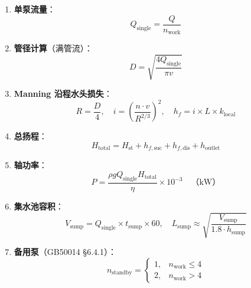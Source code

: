 \documentclass[12pt,a4paper]{ctexart}
\begin{document}
\begin{enumerate}[label=(\arabic*), leftmargin=*]
    \item \textbf{单泵流量}：
    \begin{equation}
        Q_{\text{single}} = \frac{Q}{n_{\text{work}}}
    \end{equation}

    \item \textbf{管径计算}（满管流）：
    \begin{equation}
        D = \sqrt{\frac{4Q_{\text{single}}}{\pi v}}
    \end{equation}

    \item \textbf{Manning 沿程水头损失}：
    \begin{equation}
        R = \frac{D}{4}, \quad
        i = \left(\frac{n \cdot v}{R^{2/3}}\right)^2, \quad
        h_f = i \times L \times k_{\text{local}}
    \end{equation}

    \item \textbf{总扬程}：
    \begin{equation}
        H_{\text{total}} = H_{\text{st}} + h_{f,\text{suc}} + h_{f,\text{dis}} + h_{\text{outlet}}
    \end{equation}

    \item \textbf{轴功率}：
    \begin{equation}
        P = \frac{\rho g Q_{\text{single}} H_{\text{total}}}{\eta} \times 10^{-3} \quad \text{（kW）}
    \end{equation}

    \item \textbf{集水池容积}：
    \begin{equation}
        V_{\text{sump}} = Q_{\text{single}} \times t_{\text{sump}} \times 60, \quad
        L_{\text{sump}} \approx \sqrt{\frac{V_{\text{sump}}}{1.8 \cdot h_{\text{sump}}}}
    \end{equation}

    \item \textbf{备用泵}（GB50014 \S6.4.1）：
    \begin{equation}
        n_{\text{standby}} = \begin{cases}
            1, & n_{\text{work}} \leq 4 \\
            2, & n_{\text{work}} > 4
        \end{cases}
    \end{equation}
\end{enumerate}
\end{document}
